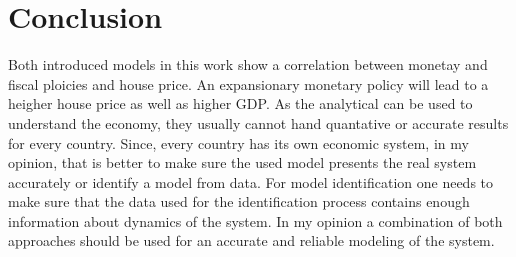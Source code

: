 \section{Conclusion}
Both introduced models in this work show a correlation between monetay and fiscal ploicies and house price. An expansionary monetary policy will lead to a heigher house price as well as higher GDP. As the analytical can be used to understand the economy, they usually cannot hand quantative or accurate results for every country. Since, every country has its own economic system, in my opinion, that is better to make sure the used model presents the real system accurately or identify a model from data. For model identification one needs to make sure that the data used for the identification process contains enough information about dynamics of the system. In my opinion a combination of both approaches should be used for an accurate and reliable modeling of the system. 
